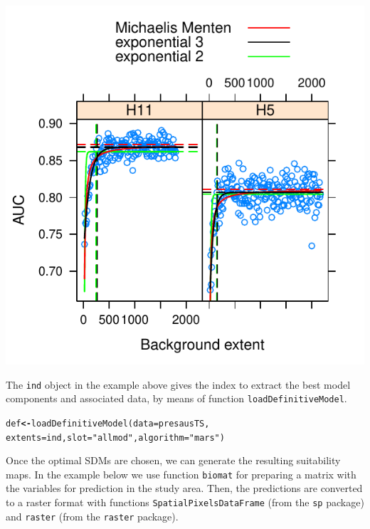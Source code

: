 \documentclass[10pt,a4paper]{article}\usepackage[]{graphicx}\usepackage[]{color}
\makeatletter
\def\maxwidth{ %
  \ifdim\Gin@nat@width>\linewidth
    \linewidth
  \else
    \Gin@nat@width
  \fi
}
\newcommand{\hlstr}[1]{\textcolor[rgb]{0.667,0.267,0}{#1}}%
\newcommand{\hlstd}[1]{\textcolor[rgb]{0,0,0}{#1}}%
\newcommand{\hlkwb}[1]{\textcolor[rgb]{0,0,0.4}{\textbf{#1}}}%
\newcommand{\hlkwc}[1]{\textcolor[rgb]{0,0,0.4}{#1}}%
\newcommand{\hlkwd}[1]{\textcolor[rgb]{0,0.267,0.4}{#1}}%
\newenvironment{kframe}{%
 \def\at@end@of@kframe{}%
 \ifinner\ifhmode%
  \def\at@end@of@kframe{\end{minipage}}%
  \begin{minipage}{\columnwidth}%
 \fi\fi%
 \def\FrameCommand##1{\hskip\@totalleftmargin \hskip-\fboxsep
 \colorbox{shadecolor}{##1}\hskip-\fboxsep
     \hskip-\linewidth \hskip-\@totalleftmargin \hskip\columnwidth}%
 \MakeFramed {\advance\hsize-\width
   \@totalleftmargin\z@ \linewidth\hsize
   \@setminipage}}%
 {\par\unskip\endMakeFramed%
 \at@end@of@kframe}
\newenvironment{knitrout}{}{} %
\makeatother
\begin{document}
\begin{knitrout}
{\centering \includegraphics[width=\maxwidth]{figure/graphics-mopa14-1} 

}



\end{knitrout}

The \texttt{ind} object in the example above gives the index to extract the best model components and associated data, by means of function \texttt{loadDefinitiveModel}.  

\begin{knitrout}
\color{fgcolor}\begin{kframe}
\begin{alltt}
\hlstd{def} \hlkwb{<-}\hlkwd{loadDefinitiveModel}\hlstd{(}\hlkwc{data} \hlstd{= presausTS,}
              \hlkwc{extents} \hlstd{= ind,} \hlkwc{slot} \hlstd{=} \hlstr{"allmod"}\hlstd{,} \hlkwc{algorithm} \hlstd{=} \hlstr{"mars"}\hlstd{)}
\end{alltt}
\end{kframe}
\end{knitrout}

Once the optimal SDMs are chosen, we can generate the resulting suitability maps. In the example below we use function \texttt{biomat} for preparing a matrix with the variables for prediction in the study area. Then, the predictions are converted to a raster format with functions \texttt{SpatialPixelsDataFrame} (from the \texttt{sp} package) and \texttt{raster} (from the \texttt{raster} package).
\end{document}
